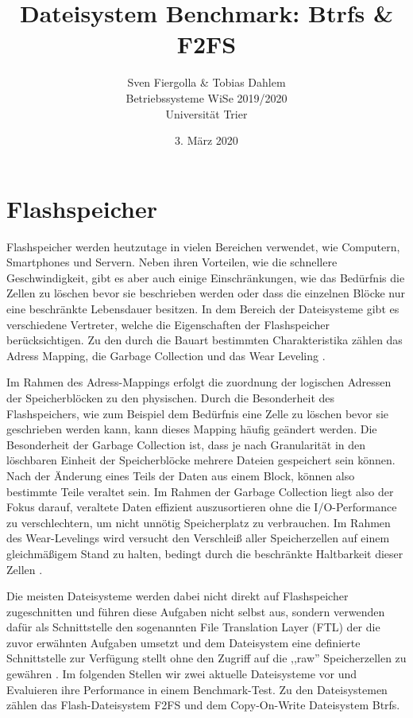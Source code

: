 \documentclass[11pt]{article}
\title{Dateisystem Benchmark: Btrfs \& F2FS}
\author{Sven Fiergolla \& Tobias Dahlem\\
Betriebssysteme WiSe 2019/2020\\
Universität Trier}
\date{3. März 2020}
\begin{document}
\maketitle

\section{Flashspeicher}
\label{flash}
Flashspeicher werden heutzutage in vielen Bereichen verwendet, wie Computern, Smartphones und Servern. Neben ihren Vorteilen, wie die schnellere Geschwindigkeit, gibt es aber auch einige Einschränkungen, wie das Bedürfnis die Zellen zu löschen bevor sie beschrieben werden oder dass die einzelnen Blöcke nur eine beschränkte Lebensdauer besitzen. In dem Bereich der Dateisysteme gibt es verschiedene Vertreter, welche die Eigenschaften der Flashspeicher berücksichtigen. Zu den durch die Bauart bestimmten Charakteristika zählen das Adress Mapping, die Garbage Collection und das Wear Leveling \cite{lee2015f2fs}.

Im Rahmen des Adress-Mappings erfolgt die zuordnung der logischen Adressen der Speicherblöcken zu den physischen. Durch die Besonderheit des Flashspeichers, wie zum Beispiel dem Bedürfnis eine Zelle zu löschen bevor sie geschrieben werden kann, kann dieses Mapping häufig geändert werden.
Die Besonderheit der Garbage Collection ist, dass je nach Granularität in den löschbaren Einheit der Speicherblöcke mehrere Dateien gespeichert sein können. Nach der Änderung eines Teils der Daten aus einem Block, können also bestimmte Teile veraltet sein. Im Rahmen der Garbage Collection liegt also der Fokus darauf, veraltete Daten effizient auszusortieren ohne die I/O-Performance zu verschlechtern, um nicht unnötig Speicherplatz zu verbrauchen.
Im Rahmen des Wear-Levelings wird versucht den Verschleiß aller Speicherzellen auf einem gleichmäßigem Stand zu halten, bedingt durch die beschränkte Haltbarkeit dieser Zellen \cite{CHUNG2009332}.

Die meisten Dateisysteme werden dabei nicht direkt auf Flashspeicher zugeschnitten und führen diese Aufgaben nicht selbst aus, sondern verwenden dafür als Schnittstelle den sogenannten File Translation Layer (FTL) der die zuvor erwähnten Aufgaben umsetzt und dem Dateisystem eine definierte Schnittstelle zur Verfügung stellt ohne den Zugriff auf die ,,raw'' Speicherzellen zu gewähren \cite{lee2015f2fs}.
Im folgenden Stellen wir zwei aktuelle Dateisysteme vor und Evaluieren ihre Performance in einem Benchmark-Test. Zu den Dateisystemen zählen das Flash-Dateisystem F2FS und dem Copy-On-Write Dateisystem Btrfs.
\end{document}
